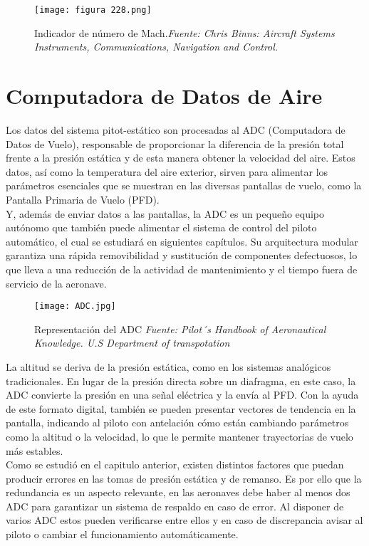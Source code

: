 \begin{figure}[H] 
	\centering
	\texttt{[image: figura 228.png]}
	\caption{\centering Indicador de número de Mach.\textit{Fuente: Chris Binns: Aircraft Systems Instruments, Communications, Navigation and Control.}}
	\label{fig:placeholderseyw}
\end{figure}



\section{Computadora de Datos de Aire}
Los datos del sistema pitot-estático son procesadas al ADC (Computadora de Datos de Vuelo), responsable de proporcionar la diferencia de la presión total frente a la presión estática y de esta manera obtener la velocidad del aire. Estos datos, así como la temperatura del aire exterior, sirven para alimentar los parámetros esenciales que se muestran en las diversas pantallas de vuelo, como la Pantalla Primaria de Vuelo (PFD).\\

Y, además de enviar datos a las pantallas, la ADC es un pequeño equipo autónomo que también puede alimentar el sistema de control del piloto automático, el cual se estudiará en siguientes capítulos. Su arquitectura modular garantiza una rápida removibilidad y sustitución de componentes defectuosos, lo que lleva a una reducción de la actividad de mantenimiento y el tiempo fuera de servicio de la aeronave.\\

\begin{figure}[H] 
	\centering
	\texttt{[image: ADC.jpg]}
	\caption{\centering Representación del ADC \textit{ Fuente: Pilot´s Handbook of Aeronautical Knowledge. U.S Department of transpotation}}
	\label{fig:placeholderxd}
\end{figure}

La altitud se deriva de la presión estática, como en los sistemas analógicos tradicionales. En lugar de la presión directa sobre un diafragma, en este caso, la ADC convierte la presión en una señal eléctrica y la envía al PFD. Con la ayuda de este formato digital, también se pueden presentar vectores de tendencia en la pantalla, indicando al piloto con antelación cómo están cambiando parámetros como la altitud o la velocidad, lo que le permite mantener trayectorias de vuelo más estables.\\

Como se estudió en el capitulo anterior, existen distintos factores que puedan producir errores en las tomas de presión estática y de remanso. Es por ello que la redundancia es un aspecto relevante, en las aeronaves debe haber al menos dos ADC para garantizar un sistema de respaldo en caso de error. Al disponer de varios ADC estos pueden verificarse entre ellos y en caso de discrepancia avisar al piloto o cambiar el funcionamiento automáticamente.\\


